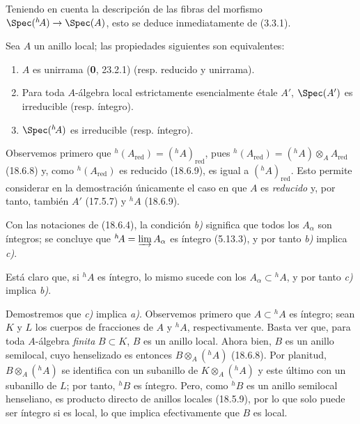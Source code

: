 Teniendo en cuenta la descripción de las fibras del morfismo $\Spec({}^h\!A)\to\Spec(A)$, esto se deduce inmediatamente de (3.3.1).

\begin{proposition}[18.6.12]
\label{IV.18.6.12}
Sea $A$ un anillo local; las propiedades siguientes son equivalentes:
\begin{enumerate}
  \item[\textup{a)}] $A$ es unirrama \textup{(\textbf{0}, 23.2.1) (resp.} reducido y unirrama\textup{)}.
  \item[\textup{b)}] Para toda $A$-álgebra local estrictamente esencialmente étale $A'$, $\Spec(A')$ es irreducible \textup{(resp.} íntegro\textup{)}.
  \item[\textup{c)}] $\Spec({}^h\!A)$ es irreducible \textup{(resp.} íntegro\textup{)}.
\end{enumerate}
\end{proposition}

Observemos primero que ${}^h(A_{\mathrm{red}})=({}^h\!A)_{\mathrm{red}}$, pues ${}^h(A_{\mathrm{red}})=({}^h\!A)\otimes_A A_{\mathrm{red}}$ (18.6.8) y, como ${}^h(A_{\mathrm{red}})$ es reducido (18.6.9), es igual a $({}^h\!A)_{\mathrm{red}}$. Esto permite considerar en la demostración únicamente el caso en que $A$ es \emph{reducido} y, por tanto, también $A'$ (17.5.7) y ${}^h\!A$ (18.6.9).

Con las notaciones de (18.6.4), la condición \emph{b)} significa que todos los $A_\alpha$ son íntegros; se concluye que ${}^h\!A=\varinjlim A_\alpha$ es íntegro (5.13.3), y por tanto \emph{b)} implica \emph{c)}.

Está claro que, si ${}^h\!A$ es íntegro, lo mismo sucede con los $A_\alpha\subset{}^h\!A$, y por tanto \emph{c)} implica \emph{b)}.

Demostremos que \emph{c)} implica \emph{a)}. Observemos primero que $A\subset{}^h\!A$ es íntegro; sean $K$ y $L$ los cuerpos de fracciones de $A$ y ${}^h\!A$, respectivamente. Basta ver que, para toda $A$-álgebra \emph{finita} $B\subset K$, $B$ es un anillo local. Ahora bien, $B$ es un anillo semilocal, cuyo henselizado es entonces $B\otimes_A({}^h\!A)$ (18.6.8). Por planitud, $B\otimes_A({}^h\!A)$ se identifica con un subanillo de $K\otimes_A({}^h\!A)$ y este último con un subanillo de $L$; por tanto, ${}^h\!B$ es íntegro. Pero, como ${}^h\!B$ es un anillo semilocal henseliano, es producto directo de anillos locales (18.5.9), por lo que solo puede ser íntegro si es local, lo que implica efectivamente que $B$ es local.

